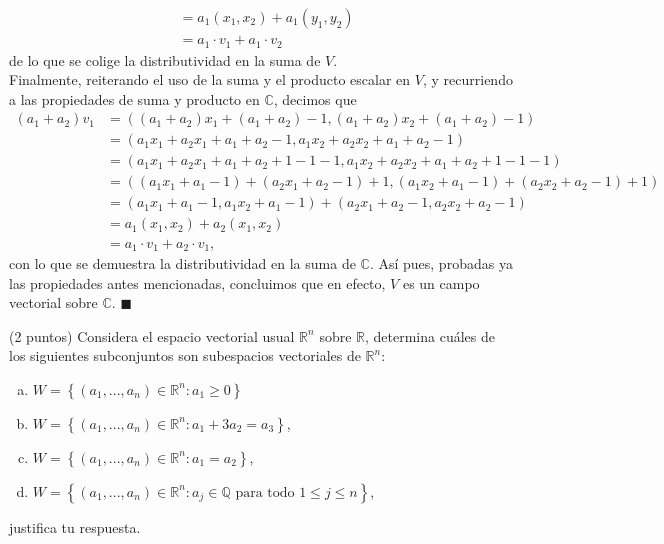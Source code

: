 \documentclass[11pt]{scrartcl}
\begin{document}
\begin{Sol}
\begin{align*}
        &=a_1(x_1,x_2)+a_1(y_1,y_2) \\
        &=a_1\cdot v_1+a_1\cdot v_2
    \end{align*}
    de lo que se colige la distributividad en la suma de $V$. \\
    Finalmente, reiterando el uso de la suma y el producto escalar en $V$, y recurriendo a las propiedades de suma y producto en $\mathbb{C}$, decimos que
    \begin{align*}
        (a_1+a_2)v_1&=((a_1+a_2)x_1+(a_1+a_2)-1,(a_1+a_2)x_2+(a_1+a_2)-1) \\
        &=(a_1x_1+a_2x_1+a_1+a_2-1,a_1x_2+a_2x_2+a_1+a_2-1) \\
        &=(a_1x_1+a_2x_1+a_1+a_2+1-1-1,a_1x_2+a_2x_2+a_1+a_2+1-1-1) \\
        &=((a_1x_1+a_1-1)+(a_2x_1+a_2-1)+1,(a_1x_2+a_1-1)+(a_2x_2+a_2-1)+1) \\
        &=(a_1x_1+a_1-1,a_1x_2+a_1-1)+(a_2x_1+a_2-1,a_2x_2+a_2-1) \\
        &=a_1(x_1,x_2)+a_2(x_1,x_2) \\
        &=a_1\cdot v_1+a_2\cdot v_1,
    \end{align*}
    con lo que se demuestra la distributividad en la suma de $\mathbb{C}$. Así pues, probadas ya las propiedades antes mencionadas, concluimos que en efecto, $V$ es
    un campo vectorial sobre $\mathbb{C}$. $\blacksquare$
\end{Sol}

\begin{mdframed}[style=mdpurplebox, frametitle={Ejercicio 3, Tarea 05, Álgebra Lineal I}]
    (2 puntos) Considera el espacio vectorial usual $\mathbb{R}^n$ sobre $\mathbb{R}$, determina cuáles de los siguientes
    subconjuntos son subespacios vectoriales de $\mathbb{R}^n$:
    \begin{enumerate}[a)]
        \item $W=\left\{(a_1,...,a_n)\in \mathbb{R}^n:a_1\geq 0\right\}$
        \item $W=\left\{(a_1,...,a_n)\in \mathbb{R}^n:a_1+3a_2=a_3\right\}$,
        \item $W=\left\{(a_1,...,a_n)\in \mathbb{R}^n:a_1=a_2\right\}$,
        \item $W=\left\{(a_1,...,a_n)\in \mathbb{R}^n:a_j \in \mathbb{Q}\text{ para todo }1\leq j \leq n\right\}$,
    \end{enumerate}
    justifica tu respuesta.
\end{mdframed}
\end{document}
